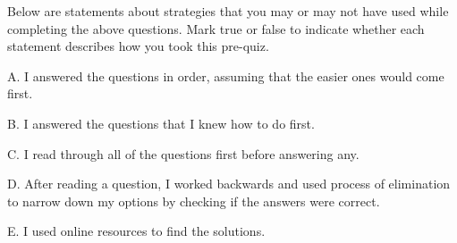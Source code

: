 \documentclass{ximera}
\begin{document}
\begin{question}

Below are statements about strategies that you may or may not have used while completing the above questions.  Mark true or false to indicate whether each statement describes how you took this pre-quiz. 

\begin{question}

A. I answered the questions in order, assuming that the easier ones would come first.

    \begin{multipleChoice}
    \end{multipleChoice}
    
\end{question}
\begin{question}
    
    B. I answered the questions that I knew how to do first.

    \begin{multipleChoice}
    \end{multipleChoice}
    
\end{question}
\begin{question}
    
    C. I read through all of the questions first before answering any.

    \begin{multipleChoice}
    \end{multipleChoice}
    
\end{question}
\begin{question}
    
    D. After reading a question, I worked backwards and used process of elimination to narrow down my options by checking if the answers were correct.

    \begin{multipleChoice}
    \end{multipleChoice}
    
\end{question}
\begin{question}    
    
    E. I used online resources to find the solutions.


\end{question}
\end{question}
\end{document}
